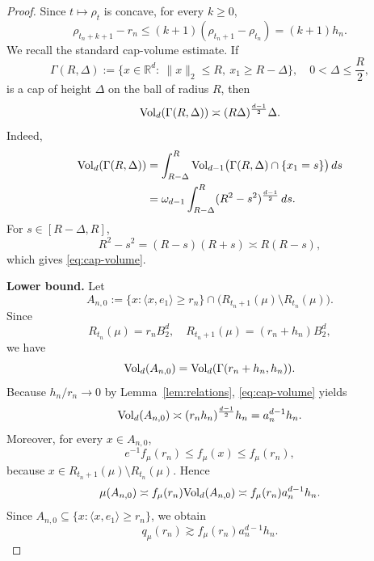 \documentclass[10pt]{amsart}
\newcommand{\1}{\textbf{1}}
\newcommand{\vol}{{\rm Vol}}
\numberwithin{equation}{section} %
\theoremstyle{remark}
\theoremstyle{definition}
\begin{document}
\begin{proof}
Since \(t\mapsto \rho_t\) is concave, for every \(k\ge 0\),
\begin{equation}\label{eq:rho-concavity-step}
\rho_{t_n+k+1}-r_n
\le (k+1)(\rho_{t_n+1}-\rho_{t_n})
=(k+1)h_n.
\end{equation}
We recall the standard cap-volume estimate. If
\[
\Gamma(R,\Delta):=\{x\in\mathbb R^d:\ \|x\|_2\le R,\ x_1\ge R-\Delta\},
\quad
0<\Delta\le \frac R2,
\]
is a cap of height \(\Delta\) on the ball of radius \(R\), then
\begin{equation}\label{eq:cap-volume}
\vol_d(\Gamma(R,\Delta))
\asymp
(R\Delta)^{\frac{d-1}{2}}\Delta.
\end{equation}
Indeed,
\begin{align*}
\vol_d(\Gamma(R,\Delta))
&=
\int_{R-\Delta}^R
\vol_{d-1}\bigl(\Gamma(R,\Delta)\cap\{x_1=s\}\bigr)\,ds  \\
&=
\omega_{d-1}\int_{R-\Delta}^R
(R^2-s^2)^{\frac{d-1}{2}}\,ds.
\end{align*}
For \(s\in[R-\Delta,R]\),
\[
R^2-s^2=(R-s)(R+s)\asymp R(R-s),
\]
which gives \eqref{eq:cap-volume}.

\medskip

\noindent\textbf{Lower bound.}
Let
\[
A_{n,0}:=
\{x:\langle x,e_1\rangle\ge r_n\}
\cap
\bigl(R_{t_n+1}(\mu)\setminus R_{t_n}(\mu)\bigr).
\]
Since
\[
R_{t_n}(\mu)=r_nB_2^d,
\quad
R_{t_n+1}(\mu)=(r_n+h_n)B_2^d,
\]
we have
\[
\vol_d(A_{n,0})
=
\vol_d(\Gamma(r_n+h_n,h_n)).
\]
Because \(h_n/r_n\to0\) by Lemma~\ref{lem:relations}, \eqref{eq:cap-volume} yields
\begin{equation}\label{eq:vol-lower-shell}
\vol_d(A_{n,0})
\asymp
(r_nh_n)^{\frac{d-1}{2}}h_n
=
a_n^{d-1}h_n.
\end{equation}
Moreover, for every \(x\in A_{n,0}\),
\[
e^{-1}f_\mu(r_n)\le f_\mu(x)\le f_\mu(r_n),
\]
because \(x\in R_{t_n+1}(\mu)\setminus R_{t_n}(\mu)\). Hence
\[
\mu(A_{n,0})
\asymp
f_\mu(r_n)\vol_d(A_{n,0})
\asymp
f_\mu(r_n)a_n^{d-1}h_n.
\]
Since \(A_{n,0}\subseteq \{x:\langle x,e_1\rangle\ge r_n\}\), we obtain
\begin{equation}\label{eq:q-lower}
q_\mu(r_n)\gtrsim f_\mu(r_n)a_n^{d-1}h_n.
\end{equation}



\end{proof}
\end{document}
